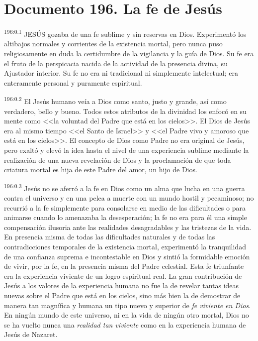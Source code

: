 \chapter{Documento 196. La fe de Jesús}
\par 
\textsuperscript{196:0.1} JESÚS gozaba de una fe sublime y sin reservas en Dios. Experimentó los altibajos normales y corrientes de la existencia mortal, pero nunca puso religiosamente en duda la certidumbre de la vigilancia y la guía de Dios. Su fe era el fruto de la perspicacia nacida de la actividad de la presencia divina, su Ajustador interior. Su fe no era ni tradicional ni simplemente intelectual; era enteramente personal y puramente espiritual.

\par 
\textsuperscript{196:0.2} El Jesús humano veía a Dios como santo, justo y grande, así como verdadero, bello y bueno. Todos estos atributos de la divinidad los enfocó en su mente como <<la voluntad del Padre que está en los cielos>>. El Dios de Jesús era al mismo tiempo <<el Santo de Israel>> y <<el Padre vivo y amoroso que está en los cielos>>. El concepto de Dios como Padre no era original de Jesús, pero exaltó y elevó la idea hasta el nivel de una experiencia sublime mediante la realización de una nueva revelación de Dios y la proclamación de que toda criatura mortal es hija de este Padre del amor, un hijo de Dios.

\par 
\textsuperscript{196:0.3} Jesús no se aferró a la fe en Dios como un alma que lucha en una guerra contra el universo y en una pelea a muerte con un mundo hostil y pecaminoso; no recurrió a la fe simplemente para consolarse en medio de las dificultades o para animarse cuando lo amenazaba la desesperación; la fe no era para él una simple compensación ilusoria ante las realidades desagradables y las tristezas de la vida. En presencia misma de todas las dificultades naturales y de todas las contradicciones temporales de la existencia mortal, experimentó la tranquilidad de una confianza suprema e incontestable en Dios y sintió la formidable emoción de vivir, por la fe, en la presencia misma del Padre celestial. Esta fe triunfante era la experiencia viviente de un logro espiritual real. La gran contribución de Jesús a los valores de la experiencia humana no fue la de revelar tantas ideas nuevas sobre el Padre que está en los cielos, sino más bien la de demostrar de manera tan magnífica y humana un tipo nuevo y superior de \textit{fe viviente en Dios}. En ningún mundo de este universo, ni en la vida de ningún otro mortal, Dios no se ha vuelto nunca una \textit{realidad tan viviente} como en la experiencia humana de Jesús de Nazaret.

